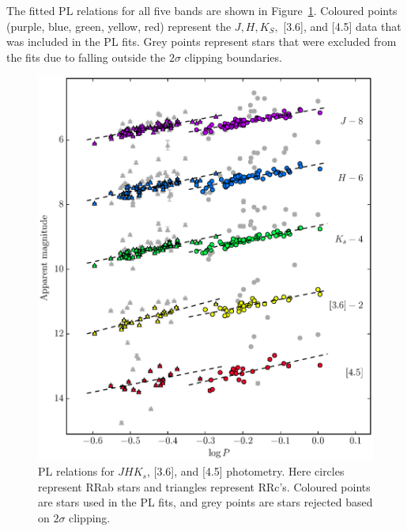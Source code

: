 \documentclass[a4paper,fleqn,usenatbib]{mnras}
\begin{document}
The fitted PL relations for all five bands are shown in Figure~\ref{fig:omegaCen_pl}. Coloured points (purple, blue, green, yellow, red) represent the $J, H, K_S,$ [3.6], and [4.5] data that was included in the PL fits. Grey points represent stars that were excluded from the fits due to falling outside the $2\sigma$ clipping boundaries. %

\begin{figure}
\begin{center}
\includegraphics[width=160mm]{../ocen_only_fitting/final_plots/omegacen_pl_fits_sigclip.eps}
\caption{PL relations for $J\!H\!K_s$, [3.6], and [4.5] photometry. Here circles represent RRab stars and triangles represent RRc's. Coloured points are stars used in the PL fits, and grey points are stars rejected based on $2\sigma$ clipping.}
\label{fig:omegaCen_pl}
\end{center}
\end{figure}
\end{document}

